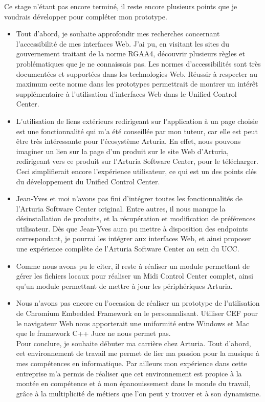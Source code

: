 \documentclass[francais]{rapportPFE}  %
\begin{document}
Ce stage n'étant pas encore terminé, il reste encore plusieurs points que je voudrais développer pour compléter mon prototype.
\begin{itemize}
    \item Tout d'abord, je souhaite approfondir mes recherches concernant l'accessibilité de mes interfaces Web. J'ai pu, en visitant les sites du gouvernement traitant de la norme RGAA4, découvrir plusieurs règles et problématiques que je ne connaissais pas. Les normes d'accessibilités sont très documentées et supportées dans les technologies Web. Réussir à respecter au maximum cette norme dans les prototypes permettrait de montrer un intérêt supplémentaire à l'utilisation d'interfaces Web dans le Unified Control Center.
    \item L'utilisation de liens extérieurs redirigeant sur l'application à un page choisie est une fonctionnalité qui m'a été conseillée par mon tuteur, car elle est peut être très intéressante pour l'écosystème Arturia. En effet, nous pouvons imaginer un lien sur la page d'un produit sur le site Web d'Arturia, redirigeant vers ce produit sur l'Arturia Software Center, pour le télécharger. Ceci simplifierait encore l'expérience utilisateur, ce qui est un des points clés du développement du Unified Control Center.
    \item Jean-Yves et moi n'avons pas fini d'intégrer toutes les fonctionnalités de l'Arturia Software Center original. Entre autres, il nous manque la désinstallation de produits, et la récupération et modification de préférences utilisateur. Dès que Jean-Yves aura pu mettre à disposition des endpoints correspondant, je pourrai les intégrer aux interfaces Web, et ainsi proposer une expérience complète de l'Arturia Software Center au sein du UCC.
    \item Comme nous avons pu le citer, il reste à réaliser un module permettant de gérer les fichiers locaux pour réaliser un Midi Control Center complet, ainsi qu'un module permettant de mettre à jour les périphériques Arturia.
    \item Nous n'avons pas encore eu l'occasion de réaliser un prototype de l'utilisation de Chromium Embedded Framework en le personnalisant. Utiliser CEF pour le navigateur Web nous apporterait une uniformité entre Windows et Mac que le framework C++ Juce ne nous permet pas.\\

Pour conclure, je souhaite débuter ma carrière chez Arturia. Tout d'abord, cet environnement de travail me permet de lier ma passion pour la musique à mes compétences en informatique. Par ailleurs mon expérience dans cette entreprise m'a permis de réaliser que cet environnement est propice à la montée en compétence et à mon épanouissement dans le monde du travail, grâce à la multiplicité de métiers que l'on peut y trouver et à son dynamisme.
\end{itemize}
\end{document}
